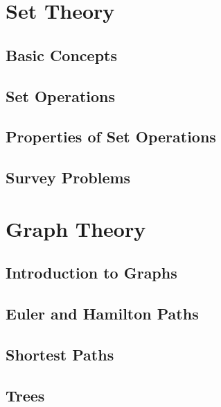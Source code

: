 \documentclass[9pt,letter,twoside,openright,fleqn]{memoir}
\begin{document}
\chapter{Set Theory}
\vfill
\pagebreak

\section{Basic Concepts}

\vfill
\pagebreak

\section{Set Operations}

\pagebreak

\section{Properties of Set Operations}

\vfill
\pagebreak

\section{Survey Problems}

\vfill
\pagebreak

\chapter{Graph Theory}
\vfill
\pagebreak

\section{Introduction to Graphs}


\section{Euler and Hamilton Paths}


\section{Shortest Paths}

\pagebreak

\section{Trees}

\end{document}
